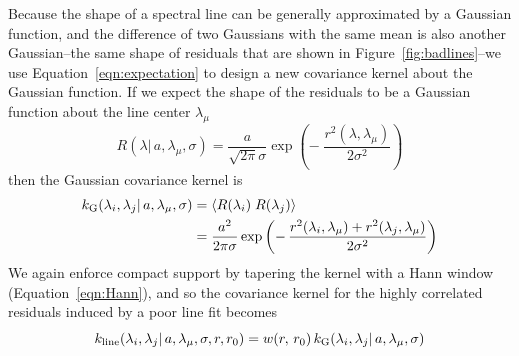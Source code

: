 \documentclass[preprint]{aastex} %
\begin{document}
Because the shape of a spectral line can be generally approximated by a Gaussian function, and the difference of two Gaussians with the same mean is also another Gaussian--the same shape of residuals that are shown in Figure~\ref{fig:badlines}--we use Equation~\ref{eqn:expectation} to design a new covariance kernel about the Gaussian function. If we expect the shape of the residuals to be a Gaussian function about the line center $\lambda_\mu$
\begin{equation}
  R(\lambda |\, a, \lambda_\mu, \sigma) = \frac{a}{\sqrt{2 \pi} \sigma} \exp \left (-\; \frac{r^2(\lambda, \lambda_\mu)}{2 \sigma^2} \right )
\end{equation}
then the Gaussian covariance kernel is
\begin{align}
k_{\rm G}(\lambda_i, \lambda_j |\, a, \lambda_\mu, \sigma) &= \langle R(\lambda_i)\; R(\lambda_j) \rangle \\
&= \frac{a^2}{2 \pi \sigma} \exp \left ( - \, \frac{r^2(\lambda_i, \lambda_\mu) 
    + r^2(\lambda_j, \lambda_\mu)}{2 \sigma^2}\right )
\end{align}
We again enforce compact support by tapering the kernel with a Hann window (Equation~\ref{eqn:Hann}), and so the covariance kernel for the highly correlated residuals induced by a poor line fit becomes
\begin{equation}
  k_{\rm line}(\lambda_i, \lambda_j |\, a, \lambda_\mu, \sigma, r, r_0) = w(r,\, r_0)\, k_{\rm G}(\lambda_i, \lambda_j |\, a, \lambda_\mu, \sigma)
  \label{eqn:line}
\end{equation}
\end{document}
